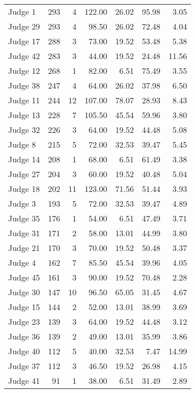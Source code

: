 \begin{tabular}{lrrrrrr}
Judge 1  &   293 &      4 & 122.00 &      26.02 &     95.98 &     3.05 \\
Judge 29 &   293 &      4 &  98.50 &      26.02 &     72.48 &     4.04 \\
Judge 17 &   288 &      3 &  73.00 &      19.52 &     53.48 &     5.38 \\
Judge 42 &   283 &      3 &  44.00 &      19.52 &     24.48 &    11.56 \\
Judge 12 &   268 &      1 &  82.00 &       6.51 &     75.49 &     3.55 \\
Judge 38 &   247 &      4 &  64.00 &      26.02 &     37.98 &     6.50 \\
Judge 11 &   244 &     12 & 107.00 &      78.07 &     28.93 &     8.43 \\
Judge 13 &   228 &      7 & 105.50 &      45.54 &     59.96 &     3.80 \\
Judge 32 &   226 &      3 &  64.00 &      19.52 &     44.48 &     5.08 \\
Judge 8  &   215 &      5 &  72.00 &      32.53 &     39.47 &     5.45 \\
Judge 14 &   208 &      1 &  68.00 &       6.51 &     61.49 &     3.38 \\
Judge 27 &   204 &      3 &  60.00 &      19.52 &     40.48 &     5.04 \\
Judge 18 &   202 &     11 & 123.00 &      71.56 &     51.44 &     3.93 \\
Judge 3  &   193 &      5 &  72.00 &      32.53 &     39.47 &     4.89 \\
Judge 35 &   176 &      1 &  54.00 &       6.51 &     47.49 &     3.71 \\
Judge 31 &   171 &      2 &  58.00 &      13.01 &     44.99 &     3.80 \\
Judge 21 &   170 &      3 &  70.00 &      19.52 &     50.48 &     3.37 \\
Judge 4  &   162 &      7 &  85.50 &      45.54 &     39.96 &     4.05 \\
Judge 45 &   161 &      3 &  90.00 &      19.52 &     70.48 &     2.28 \\
Judge 30 &   147 &     10 &  96.50 &      65.05 &     31.45 &     4.67 \\
Judge 15 &   144 &      2 &  52.00 &      13.01 &     38.99 &     3.69 \\
Judge 23 &   139 &      3 &  64.00 &      19.52 &     44.48 &     3.12 \\
Judge 36 &   139 &      2 &  49.00 &      13.01 &     35.99 &     3.86 \\
Judge 40 &   112 &      5 &  40.00 &      32.53 &      7.47 &    14.99 \\
Judge 37 &   112 &      3 &  46.50 &      19.52 &     26.98 &     4.15 \\
Judge 41 &    91 &      1 &  38.00 &       6.51 &     31.49 &     2.89 \\
\bottomrule
\end{tabular}
